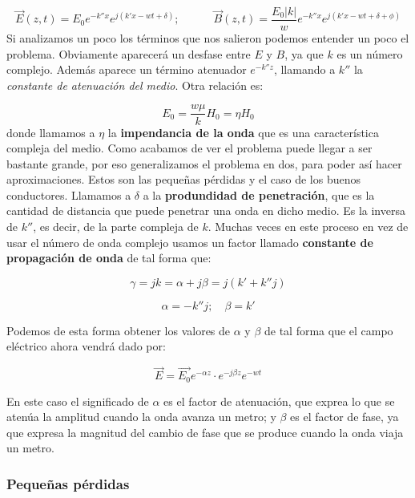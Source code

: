 \documentclass[12pt]{article}
\newcommand{\tquad}{\quad \quad \quad}
\begin{document}
\begin{equation}
\vec{E}(z,t) = E_0 e^{-k''x} e^{j(k'x-wt+\delta)}; \tquad
\vec{B}(z,t) = \dfrac{E_0 |k|}{w} e^{-k''x} e^{j(k'x-wt+\delta+\phi)}
\end{equation}
Si analizamos un poco los términos que nos salieron podemos entender un poco el problema. Obviamente aparecerá un desfase entre $E$ y $B$, ya que $k$ es un número complejo. Además aparece un término atenuador $e^{-k''z}$, llamando a $k''$ la \textit{constante de atenuación del medio}. Otra relación es:

\begin{equation}
E_0 = \dfrac{w \mu}{k} H_0 = \eta H_0
\end{equation} 
donde llamamos a $\eta$ la \textbf{impendancia de la onda} que es una característica compleja del medio. Como acabamos de ver el problema puede llegar a ser bastante grande, por eso generalizamos el problema en dos, para poder así hacer aproximaciones. Estos son las pequeñas pérdidas y el caso de los buenos conductores. Llamamos a $\delta$ a la \textbf{produndidad de penetración}, que es la cantidad de distancia que puede penetrar una onda en dicho medio. Es la inversa de $k''$, es decir, de la parte compleja de $k$. Muchas veces en este proceso en vez de usar el número de onda complejo usamos un factor llamado \textbf{constante de propagación de onda} de tal forma que:

\begin{equation}
\gamma = j k = \alpha + j \beta = j(k'+k''j)
\end{equation}

\begin{equation}
\alpha = - k''j; \quad  \beta = k'
\end{equation}

Podemos de esta forma obtener los valores de $\alpha$ y $\beta$ de tal forma que el campo eléctrico ahora vendrá dado por:

\begin{equation}
\vec{E} = \vec{E_0} e^{- \alpha z} \cdot e^{- j \beta z} e^{-wt} 
\end{equation}

En este caso el significado de $\alpha$ es el factor de atenuación, que exprea lo que se atenúa la amplitud cuando la onda avanza un metro; y $\beta$ es el factor de fase, ya que expresa la magnitud del cambio de fase que se produce cuando la onda viaja un metro. 

\subsubsection{Pequeñas pérdidas}
\end{document}
